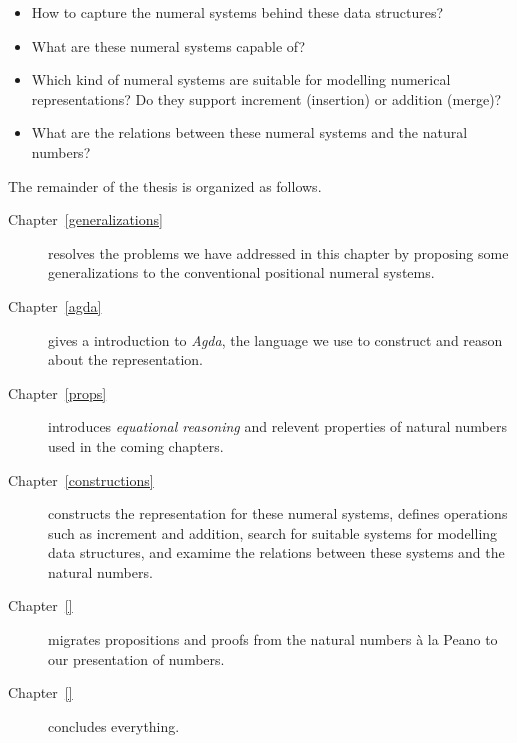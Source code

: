 \documentclass[\main/thesis.tex]{subfiles}
\begin{document}
\begin{itemize}
    \item How to capture the numeral systems behind these data structures?
    \item What are these numeral systems capable of?
    \item Which kind of numeral systems are suitable for modelling numerical
        representations? Do they support increment (insertion) or addition (merge)?
    \item What are the relations between these numeral systems and the natural numbers?
\end{itemize}

The remainder of the thesis is organized as follows.

\begin{description}
    \item[Chapter~\ref{generalizations}]
        resolves the problems we have addressed in this chapter by proposing
        some generalizations to the conventional positional numeral systems.
   \item[Chapter~\ref{agda}]
        gives a introduction to \textit{Agda}, the language we use to construct
        and reason about the representation.
   \item[Chapter~\ref{props}]
        introduces \textit{equational reasoning} and relevent properties
        of natural numbers used in the coming chapters.
   \item[Chapter~\ref{constructions}] constructs the representation for these
        numeral systems, defines operations such as increment and addition,
        search for suitable systems for modelling data structures,
        and examime the relations between these systems and the natural numbers.
    \item[Chapter~\ref{}] migrates propositions and proofs from the natural
        numbers à la Peano to our presentation of numbers.
    \item[Chapter~\ref{}] concludes everything.
\end{description}


%
%
\end{document}
